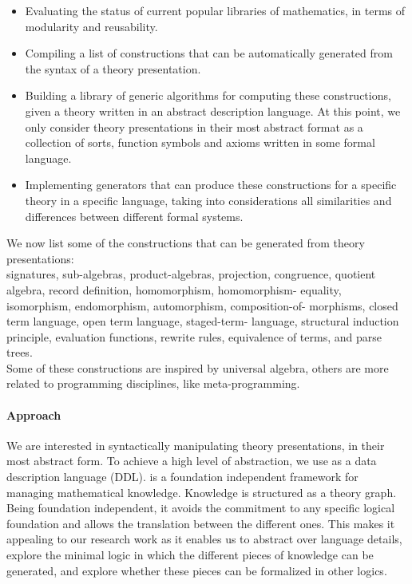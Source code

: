 \documentclass[a4paper]{article}
\begin{document}
\begin{itemize}
	\item Evaluating the status of current popular libraries of mathematics, in terms of modularity and 
	reusability.
	\item Compiling a list of constructions that can be automatically generated from the syntax of a 
	theory presentation. 
	\item Building a library of generic algorithms for computing these constructions, given a theory 
	written in an abstract description language. At this point, we only consider 
	theory presentations in their most abstract format as a collection of sorts, function symbols and 
	axioms written in some formal language.  
	\item Implementing generators that can produce these constructions for a specific theory in a 
	specific language, taking into considerations all similarities and differences between different formal 
	systems.   
\end{itemize}

We now list some of the constructions that can be generated from theory presentations: \\ 
signatures, sub-algebras, product-algebras, projection, congruence, 
quotient algebra, record definition, homomorphism, homomorphism- 
equality, isomorphism, endomorphism, automorphism, composition-of-
morphisms, closed term language, open term language, staged-term-
language, structural induction principle, evaluation functions, 
rewrite rules, equivalence of terms, and parse trees. \\
Some of these constructions are inspired by universal algebra, others are more related to programming 
disciplines, like meta-programming. 

\paragraph{Approach}
We are interested in syntactically manipulating theory presentations, in their most abstract form. To 
achieve a high level of abstraction, we use \mmt \cite{kohlhase2010towards} as a data description 
language (DDL). 
\mmt is a foundation independent framework for managing mathematical knowledge. Knowledge is 
structured as a theory graph. 
Being foundation independent, it avoids the commitment to any specific logical foundation and allows 
the translation between the different ones. This makes it appealing to our research work as it enables 
us to abstract 
over language details, explore the minimal logic in which the different pieces of knowledge can be 
generated, and explore whether these pieces can be formalized in other logics. 
\end{document}
